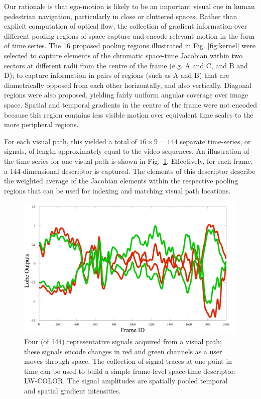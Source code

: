 Our rationale is that ego-motion is likely to be an important visual cue in human pedestrian navigation, particularly in close or cluttered spaces. Rather than explicit computation of optical flow, the collection of gradient information over different pooling regions of space capture and encode relevant motion in the form of time series.  The 16 proposed pooling regions illustrated in Fig. \ref{fig:kernel} were selected to capture elements of the chromatic space-time Jacobian within two sectors at different radii from the centre of the frame (e.g. A and C, and B and D); to capture information in pairs of regions (such as A and B) that are diametrically opposed from each other horizontally, and also vertically.  Diagonal regions were also proposed, yielding fairly uniform angular coverage over image space. Spatial and temporal gradients in the centre of the frame were not encoded because this region contains less visible motion over equivalent time scales to the more peripheral regions.  


For each visual path, this yielded a total of $16\times 9 = 144$ separate time-series, or signals, of length approximately equal to the video sequences.  An illustration of the time series for one visual path is shown in Fig.~\ref{fig:Traces}. Effectively, for each frame, a 144-dimensional descriptor is captured. The elements of this descriptor describe the weighted average of the Jacobian elements within the respective pooling regions that can be used for indexing and matching visual path locations.

\begin{figure}
\begin{center}
\includegraphics[width=\linewidth]{./gfx/Chapter04/Lobe1and6_red_green.pdf}
\caption{Four (of 144) representative signals acquired from a visual path; these signals encode changes in red and green channels as a user moves through space.  The collection of signal traces at one point in time can be used to build a simple frame-level space-time descriptor: LW-COLOR. The signal amplitudes are spatially pooled temporal and spatial gradient intensities.}
\label{fig:Traces}
\end{center}
\end{figure}

